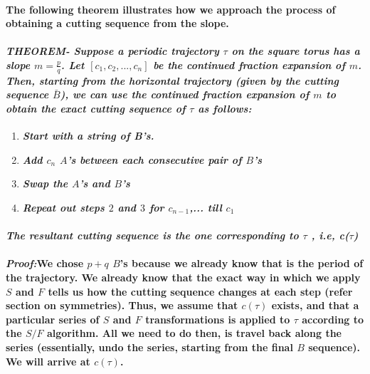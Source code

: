 \documentclass{report}
\begin{document}
\paragraph{The following theorem illustrates how we approach the process of obtaining a cutting sequence from the slope.}

\paragraph{\textit{THEOREM- Suppose a periodic trajectory $\tau$ on the square torus has a slope $m=\frac{p}{q}$. Let $[c_1, c_2,..., c_n]$ be the continued fraction expansion of $m$. Then, starting from the horizontal trajectory (given by the cutting sequence $\bar{B}$), we can use the continued fraction expansion of $m$ to obtain the exact cutting sequence of $\tau$ as follows:}}

\begin{enumerate}
\item \textbf{ \textit{Start with a string of B’s.}}

\item \textbf{ \textit{Add $c_n$ $A$’s between each consecutive pair of $B$’s}}

\item \textbf{ \textit{Swap the $A$’s and $B$’s}}

\item \textbf{ \textit{Repeat out steps $2$ and $3$ for $c_{n-1}$,... till $c_1$}}
\end{enumerate}

\paragraph{\textit{The resultant cutting sequence is the one corresponding to $\tau$ , i.e, c($\tau$)}}

\paragraph{\textit{Proof:}We chose $p+q$ $B$’s because we already know that is the period of the trajectory. We already know that the exact way in which we apply $S$ and $F$ tells us how the cutting sequence changes at each step (refer section on symmetries). Thus, we assume that $c(\tau)$ exists, and that a particular series of $S$ and $F$ transformations is applied to $\tau$ according to the $S/F$ algorithm. All we need to do then, is travel back along the series (essentially, undo the series, starting from the final $B$ sequence). We will arrive at $c(\tau)$.}
\end{document}
